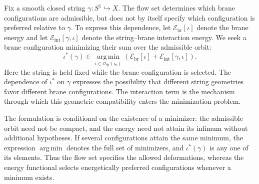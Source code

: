 \documentclass{article}
\numberwithin{tm}{section}
\numberwithin{dn}{section}
\numberwithin{as}{section}
\numberwithin{rk}{section}
\numberwithin{lem}{section}
\numberwithin{ax}{section}
\numberwithin{pp}{section}
\numberwithin{eg}{section}
\numberwithin{war}{section}
\numberwithin{equation}{section}
\numberwithin{prop}{section}
\numberwithin{nt}{section}
\numberwithin{rc}{section}
\begin{document}
Fix a smooth closed string
\(\gamma:S^1\hookrightarrow X\). The flow set determines which
brane configurations are admissible, but does not by itself specify
which configuration is preferred relative to \(\gamma\). To express
this dependence, let
\(\mathcal E_{\mathrm{br}}[\iota]\) denote the brane energy and
let \(\mathcal E_{\mathrm{int}}[\gamma,\iota]\) denote the
string--brane interaction energy. We seek a brane configuration
minimizing their sum over the admissible orbit:
\begin{equation} \label{Master}
	\boxed{
		\iota^\ast(\gamma)
		\in
		\underset{\iota\in\mathcal O_{\mathfrak B}(\iota_0)}
		{\operatorname{arg\,min}}
		\left(
		\mathcal E_{\mathrm{br}}[\iota]
		+
		\mathcal E_{\mathrm{int}}[\gamma,\iota]
		\right).
	}
\end{equation}
Here the string is held fixed while the brane configuration is
selected. The dependence of \(\iota^\ast\) on \(\gamma\) expresses
the possibility that different string geometries favor different
brane configurations. The interaction term is the mechanism through
which this geometric compatibility enters the minimization problem.

The formulation is conditional on the existence of a minimizer:
the admissible orbit need not be compact, and the energy need not
attain its infimum without additional hypotheses. If several
configurations attain the same minimum, the expression
\(\operatorname{arg\,min}\) denotes the full set of minimizers, and
\(\iota^\ast(\gamma)\) is any one of its elements. Thus the flow set
specifies the allowed deformations, whereas the energy functional
selects energetically preferred configurations whenever a minimum
exists.
\end{document}

